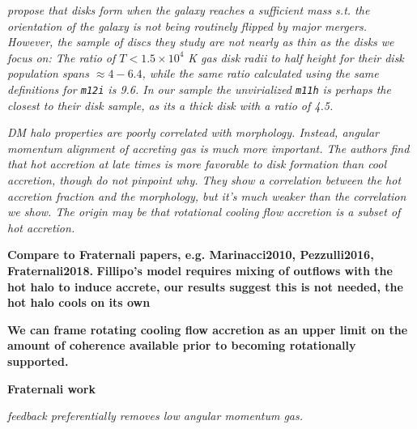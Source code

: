 \documentclass[fleqn,usenatbib]{mnras}
\begin{document}
\textit{
\cite{Dekel2020a} propose that disks form when the galaxy reaches a sufficient mass s.t. the orientation of the galaxy is not being routinely flipped by major mergers.
However, the sample of discs they study are not nearly as thin as the disks we focus on:
The ratio of $T < 1.5 \times 10^4$ K gas disk radii to half height for their disk population spans $\approx 4-6.4$, while the same ratio calculated using the same definitions for \texttt{m12i} is 9.6.
In our sample the unvirialized \texttt{m11h} is perhaps the closest to their disk sample, as its a thick disk with a ratio of 4.5.
}

\textit{
DM halo properties are poorly correlated with morphology.
Instead, angular momentum alignment of accreting gas is much more important.
The authors find that hot accretion at late times is more favorable to disk formation than cool accretion, though do not pinpoint why.
They show a correlation between the hot accretion fraction and the morphology, but it's much weaker than the correlation we show.
The origin may be that rotational cooling flow accretion is a subset of hot accretion.
}

\textbf{Compare to Fraternali papers, e.g. Marinacci2010, Pezzulli2016, Fraternali2018.}
\textbf{Fillipo's model requires mixing of outflows with the hot halo to induce accrete, our results suggest this is not needed, the hot halo cools on its own}


\textbf{We can frame rotating cooling flow accretion as an upper limit on the amount of coherence available prior to becoming rotationally supported.}

\cite{Stewart2013, Danovich2015}

\textbf{Fraternali work}

\textit{
\cite{Ubler2014} feedback preferentially removes low angular momentum gas.
}


\end{document}
